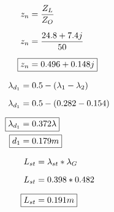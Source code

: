   \begin{figure}[!ht]
    \centering
    \begin{minipage}[t]{0.3\textwidth}
      \begin{align*}
        z_n &= \frac{Z_L}{Z_O} \\[6pt]
        z_n &= \frac{24.8 + 7.4j}{50} \\[6pt]
        \Aboxed{z_n &= 0.496 + 0.148j}
      \end{align*}
    \end{minipage}
    \hfill
    \begin{minipage}[t]{0.3\textwidth}
      \begin{align*}
        \lambda_{d_1} &= 0.5 - (\lambda_1 - \lambda_2) \\[6pt]
        \lambda_{d_1} &= 0.5 - (0.282 - 0.154) \\[6pt]
        \Aboxed{\lambda_{d_1} &= 0.372 \lambda} \\
        \Aboxed{d_1 &= 0.179m}
      \end{align*}
    \end{minipage}
    \hfill
    \begin{minipage}[t]{0.3\textwidth}
      \begin{align*}
        L_{st} &= \lambda_{st} * \lambda_G \\[6pt]
        L_{st} &= 0.398 * 0.482 \\[6pt]
        \Aboxed{L_{st} &= 0.191m}
      \end{align*}
    \end{minipage}
  \end{figure}

  
